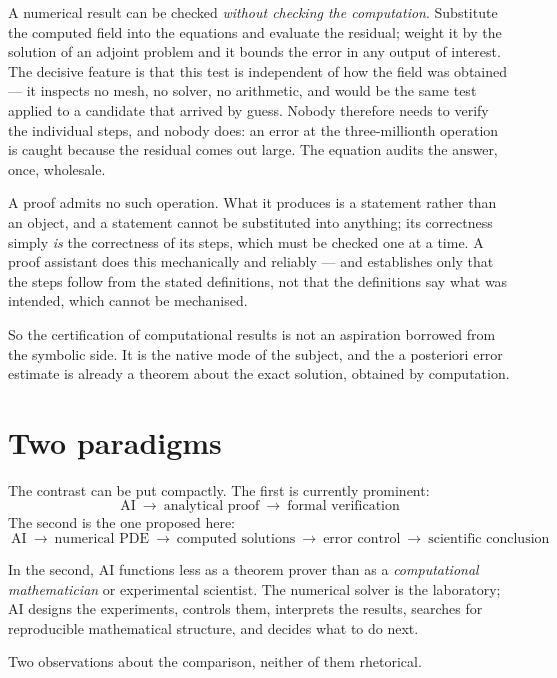 \documentclass[11pt]{article}
\begin{document}
A numerical result can be checked \emph{without checking the computation}. Substitute the computed
field into the equations and evaluate the residual; weight it by the solution of an adjoint problem
and it bounds the error in any output of interest. The decisive feature is that this test is
independent of how the field was obtained --- it inspects no mesh, no solver, no arithmetic, and
would be the same test applied to a candidate that arrived by guess. Nobody therefore needs to verify
the individual steps, and nobody does: an error at the three-millionth operation is caught because
the residual comes out large. The equation audits the answer, once, wholesale.

A proof admits no such operation. What it produces is a statement rather than an object, and a
statement cannot be substituted into anything; its correctness simply \emph{is} the correctness of
its steps, which must be checked one at a time. A proof assistant does this mechanically and
reliably --- and establishes only that the steps follow from the stated definitions, not that the
definitions say what was intended, which cannot be mechanised.

So the certification of computational results is not an aspiration borrowed from the symbolic side.
It is the native mode of the subject, and the a posteriori error estimate is already a theorem about
the exact solution, obtained by computation.

\section{Two paradigms}\label{sec:paradigms}

The contrast can be put compactly. The first is currently prominent:
\[
\boxed{\ \text{AI}\ \rightarrow\ \text{analytical proof}\ \rightarrow\ \text{formal verification}\ }
\]
The second is the one proposed here:
\[
\boxed{\ \text{AI}\ \rightarrow\ \text{numerical PDE}\ \rightarrow\ \text{computed solutions}\
\rightarrow\ \text{error control}\ \rightarrow\ \text{scientific conclusion}\ }
\]

In the second, AI functions less as a theorem prover than as a \emph{computational mathematician} or
experimental scientist. The numerical solver is the laboratory; AI designs the experiments, controls
them, interprets the results, searches for reproducible mathematical structure, and decides what to
do next.

Two observations about the comparison, neither of them rhetorical.
\end{document}
